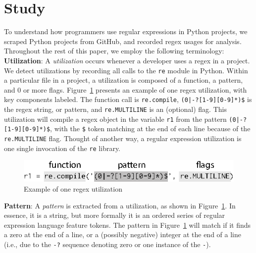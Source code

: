\section{Study}
\label{sec:study}

To understand how programmers use regular expressions in Python projects, we scraped  Python projects from GitHub, and recorded regex usages for analysis. Throughout the rest of this paper, we  employ the following terminology:\\

\noindent \textbf{Utilization}: A \emph{utilization} occurs whenever a developer uses a regex  in a project.  We detect utilizations by recording all calls to the {\tt re} module in Python.
Within a particular file in a project, a {utilization} is composed of a function, a pattern, and 0 or more flags.  Figure~\ref{fig:exampleUsage} presents an example of one regex {utilization}, with key components labeled. The function call is {\tt re.compile}, \verb!(0|-?[1-9][0-9]*)$! is the regex string, or pattern, and {\tt re.MULTILINE} is an (optional) flag. This {utilization}  will compile a regex object in the variable {\tt r1} from the pattern \verb!(0|-?[1-9][0-9]*)$!, with the \verb!$! token matching at the end of each line because of the {\tt re.MULTILINE} flag. Thought of another way, a regular expression  utilization is one single invocation of the {\tt re} library.\\





\begin{figure}[tb]
\centering
\includegraphics[width=\columnwidth]{../illustrations/exampleUsage.eps}
\caption{Example of one regex utilization}
\label{fig:exampleUsage}
\end{figure}



\noindent \textbf{Pattern}: A \emph{pattern} is extracted from a utilization, as shown in Figure~\ref{fig:exampleUsage}. In essence, it is a string, but more formally it is an ordered series of regular expression language feature tokens.  The pattern in Figure~\ref{fig:exampleUsage}  will match if it finds a zero at the end of a line, or a (possibly negative) integer at the end of a line (i.e., due to the {\tt -?} sequence denoting zero or one instance of the {\tt -}).

